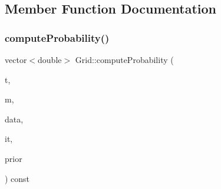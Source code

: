 \subsection{Member Function Documentation}
\mbox{\label{class_grid_a15b32bc4e110b63b3506cd932afa5e2a}} 
\subsubsection{\texorpdfstring{compute\+Probability()}{computeProbability()}}
{\footnotesize\ttfamily vector$<$double$>$ Grid\+::compute\+Probability (\begin{DoxyParamCaption}\item[{unsigned long}]{t,  }\item[{\hyperlink{class_mobile_phone}{Mobile\+Phone} $\ast$}]{m,  }\item[{vector$<$ \hyperlink{class_antenna_info}{Antenna\+Info} $>$ \&}]{data,  }\item[{pair$<$ \hyperlink{_agents_collection_8h_afde47bc45d604b8b8c72755072376679}{um\+\_\+iterator}, \hyperlink{_agents_collection_8h_afde47bc45d604b8b8c72755072376679}{um\+\_\+iterator} $>$}]{it,  }\item[{\hyperlink{_prior_type_8h_a61286c562e68de246982fc393a7c23a5}{Prior\+Type}}]{prior }\end{DoxyParamCaption}) const}

